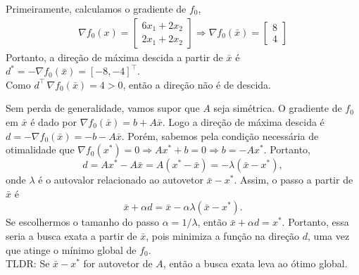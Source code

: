 \begin{questions}
\begin{solution}
	Primeiramente, calculamos o gradiente de $f_0$,
    \begin{align*}
    \nabla f_0(x) = 
        \begin{bmatrix}
    		6 x_1 + 2 x_2 \\
            2 x_1 + 2 x_2
		\end{bmatrix}
        \Rightarrow
    	\nabla f_0(\bar x) = 
        \begin{bmatrix}
    		8 \\
            4
		\end{bmatrix}
    \end{align*}
    Portanto, a direção de máxima descida a partir de $\bar x$ é $d^* = -\nabla f_0(\bar x) = [-8,-4]^\top $.\\
    Como $d^\top \,\nabla f_0(\bar x) = 4 > 0$, então a direção não é de descida.
\end{solution}

\begin{solution}
	Sem perda de generalidade, vamos supor que $A$ seja simétrica. O gradiente de $f_0$ em $\bar x$ é dado por $\nabla f_0(\bar x) = b + A\bar x$. Logo a direção de máxima descida é $d = -\nabla f_0(\bar x) = -b - A\bar x$. Porém, sabemos pela condição necessária de otimalidade que 
    $\nabla f_0(x^*) = 0 \Rightarrow Ax^* + b = 0 \Rightarrow b = -Ax^*.$
    Portanto,
    \[d = Ax^* - A\bar x = A(x^*-\bar x) = -\lambda (\bar x - x^*),\]
    onde $\lambda$ é o autovalor relacionado ao autovetor $\bar x - x^*$. Assim, o passo a partir de $\bar x$ é
    \[\bar x + \alpha d = \bar x - \alpha\lambda (\bar x - x^*).\]
    Se escolhermos o tamanho do passo $\alpha = 1/\lambda$, então $\bar x + \alpha d = x^*$. Portanto, essa seria a busca exata a partir de $\bar x$, pois minimiza a função na direção $d$, uma vez que atinge o mínimo global de $f_0$.\\
    TLDR: Se $\bar x - x^*$ for autovetor de $A$, então a busca exata leva ao ótimo global.
\end{solution}


\end{questions}
